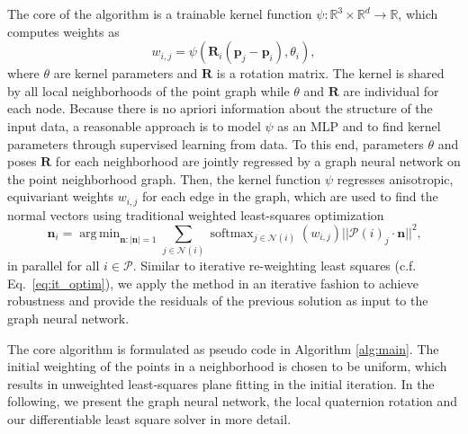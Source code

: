 \documentclass[10pt,twocolumn,letterpaper]{article}
\DeclareMathOperator*{\argmin}{arg\,min}
\DeclareMathOperator*{\softmax}{softmax}
\begin{document}
The core of the algorithm is a trainable kernel function $\psi: \mathbb{R}^3 \times \mathbb{R}^d \rightarrow \mathbb{R}$, which computes weights as
\begin{equation}
w_{i,j} = \psi(\mathbf{R}_i(\mathbf{p}_j - \mathbf{p}_i), \theta_i), \label{eq:irlsw}
\end{equation}
where $\theta$ are kernel parameters and $\mathbf{R}$ is a rotation matrix. The kernel is shared by all local neighborhoods of the point graph while $\theta$ and $\mathbf{R}$ are individual for each node. Because there is no apriori information about the structure of the input data, a reasonable approach is to model $\psi$ as an MLP and to find kernel parameters through supervised learning from data.  To this end, parameters $\theta$ and poses $\mathbf{R}$ for each neighborhood are jointly regressed by a graph neural network on the point neighborhood graph. Then, the kernel function $\psi$ regresses anisotropic, equivariant weights $w_{i,j}$ for each edge in the graph, which are used to find the normal vectors using traditional weighted least-squares optimization
\begin{equation}
\mathbf{n}_i = \argmin_{\mathbf{n}:|\mathbf{n}|=1} \sum_{j\in\mathcal{N}(i)} \softmax_{j\in\mathcal{N}(i)}(w_{i,j}) || \mathcal{P}(i)_j\cdot \mathbf{n} ||^2 \textrm{,} \label{eq:irlsn}
\end{equation}
in parallel for all $i \in \mathcal{P}$. 
Similar to iterative re-weighting least squares (c.f. Eq.~\ref{eq:it_optim}), we apply the method in an iterative fashion to achieve robustness and provide the residuals of the previous solution as input to the graph neural network. 

The core algorithm is formulated as pseudo code in Algorithm \ref{alg:main}. The initial weighting of the points in a neighborhood is chosen to be uniform, which results in unweighted least-squares plane fitting in the initial iteration.
In the following, we present the graph neural network, the local quaternion rotation and our differentiable least square solver in more detail.
\end{document}
